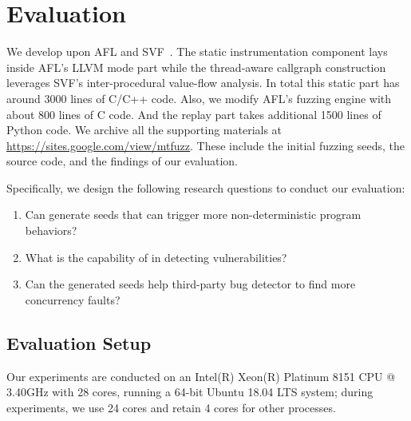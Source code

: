 \section{Evaluation}

We develop \mtfuzz upon AFL and SVF~\cite{Sui:2016:SVF,DBLP:conf/ppopp/DiS16,DBLP:conf/cgo/SuiDX16}. 
The static instrumentation component lays inside AFL's LLVM mode part while the 
thread-aware callgraph construction leverages SVF's inter-procedural value-flow 
analysis. In total this static part has around 3000 lines of C/C++ code. Also, 
we modify AFL's fuzzing engine with about 800 lines of C code. And the replay part 
takes additional 1500 lines of Python code. We archive all the supporting materials 
at \underline{\url{https://sites.google.com/view/mtfuzz}}. These include the initial 
fuzzing seeds, the source code, and the findings of our evaluation.

Specifically, we design the following research questions to conduct our evaluation:
\begin{enumerate}[{\bf RQ1}]
    \item Can \mtfuzz generate seeds that can trigger more non-deterministic 
			program behaviors?
    \item What is the capability of \mtfuzz in detecting vulnerabilities?
    \item Can the generated seeds help third-party bug detector to find more 
			concurrency faults?
\end{enumerate}

\subsection{Evaluation Setup}
Our experiments are conducted on an Intel(R) Xeon(R) Platinum
8151 CPU @ 3.40GHz with 28 cores, running a 64-bit Ubuntu 18.04
LTS system; during experiments, we use 24 cores and retain 4 cores
for other processes.

